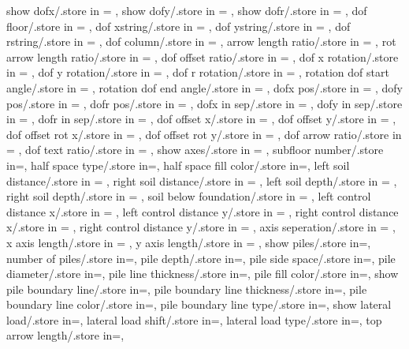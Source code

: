 {  show dofx/.store in = \shodofx,
  show dofy/.store in = \shodofy,
  show dofr/.store in = \shodofr,
  dof floor/.store in = \doflocfloor,
  dof xstring/.store in = \dofxstr,
  dof ystring/.store in = \dofystr,
  dof rstring/.store in = \dofrstr,
  dof column/.store in = \dofloccolumn,
  arrow length ratio/.store in = \arrowlenratio,
  rot arrow length ratio/.store in = \rotarrowlenratio,
  dof offset ratio/.store in = \dofoffsetratio,
  dof x rotation/.store in = \dofxrotation,
  dof y rotation/.store in = \dofyrotation,
  dof r rotation/.store in = \dofrrotation,
  rotation dof start angle/.store in = \rotdofstartangle,
  rotation dof end angle/.store in = \rotdofendangle,
  dofx pos/.store in = \dofposx,
  dofy pos/.store in = \dofposy,
  dofr pos/.store in = \dofposr,
  dofx in sep/.store in = \dofinnersepx,
  dofy in sep/.store in = \dofinnersepy,
  dofr in sep/.store in = \dofinnersepr,
  dof offset x/.store in = \dofoffsetx,
  dof offset y/.store in = \dofoffsety,
  dof offset rot x/.store in = \dofrotoffsetx,  
  dof offset rot y/.store in = \dofrotoffsety,
  dof arrow ratio/.store in = \dofarrowratio,
  dof text ratio/.store in = \doftextratio,
  show axes/.store in = \showaxes,
  subfloor number/.store in=\subfloors,
  half space type/.store in=\halfspacetype,
  half space fill color/.store in=\halfspacefillcolor,
  left soil distance/.store in = \leftsoildist,
  right soil distance/.store in = \rightsoildist,
  left soil depth/.store in = \leftsoildepth,
  right soil depth/.store in = \rightsoildepth,
  soil below foundation/.store in = \soilbelowfound,
  left control distance x/.store in = \leftcontrolx,
  left control distance y/.store in = \leftcontroly,
  right control distance x/.store in = \rightcontrolx,
  right control distance y/.store in = \rightcontroly,
  axis seperation/.store in = \axisseperation,
  x axis length/.store in = \axeslenX,
  y axis length/.store in = \axeslenY,
  show piles/.store in=\showpiles,
  number of piles/.store in=\numberofpiles,
  pile depth/.store in=\piledepth,
  pile side space/.store in=\pilesidespace,
  pile diameter/.store in=\pilediameter,
  pile line thickness/.store in=\pilelinethickness,
  pile fill color/.store in=\pilefillcolor,
  show pile boundary line/.store in=\showpbline,
  pile boundary line thickness/.store in=\pblinet,
  pile boundary line color/.store in=\pblinecolor,
  pile boundary line type/.store in=\pblinetype,
  show lateral load/.store in=\showlatload,
  lateral load shift/.store in=\latloadshift,
  lateral load type/.store in=\latloadtype,
  top arrow length/.store in=\toparrlen,
}
